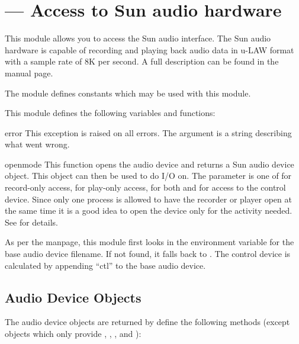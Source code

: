 \section{ ---
         Access to Sun audio hardware}



This module allows you to access the Sun audio interface. The Sun
audio hardware is capable of recording and playing back audio data
in u-LAW format with a sample rate of 8K per second. A
full description can be found in the  manual page.

The module
defines constants which may be used with this module.

This module defines the following variables and functions:

\begin{excdesc}{error}
This exception is raised on all errors. The argument is a string
describing what went wrong.
\end{excdesc}

\begin{funcdesc}{open}{mode}
This function opens the audio device and returns a Sun audio device
object. This object can then be used to do I/O on. The  parameter
is one of  for record-only access,  for play-only
access,  for both and  for access to the
control device. Since only one process is allowed to have the recorder
or player open at the same time it is a good idea to open the device
only for the activity needed. See  for details.

As per the manpage, this module first looks in the environment
variable  for the base audio device filename.  If not
found, it falls back to .  The control device is
calculated by appending ``ctl'' to the base audio device.
\end{funcdesc}


\subsection{Audio Device Objects \label{audio-device-objects}}

The audio device objects are returned by  define the
following methods (except  objects which only provide
, , , and
):

